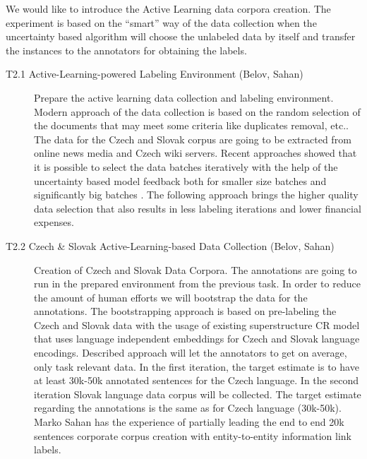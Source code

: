 We would like to introduce the Active Learning data corpora creation. The experiment is based on the “smart” way of the data collection when the uncertainty based algorithm will choose the unlabeled data by itself and transfer the instances to the annotators for obtaining the labels. 

\begin{description}
	\item [T2.1 Active-Learning-powered Labeling Environment (Belov, Sahan)] Prepare the active learning data collection and labeling environment.
Modern approach of the data collection is based on the random selection of the documents that may meet some criteria like duplicates removal, etc.. The data for the Czech and Slovak corpus are going to be extracted from online news media and Czech wiki servers. Recent approaches showed that it is possible to select the data batches iteratively with the help of the uncertainty based model feedback both for smaller size batches \cite{gal2017deep, lowell2018practical} and significantly big batches \cite{citovsky2021batch}. The following approach brings the higher quality data selection that also results in less labeling iterations and lower financial expenses.

	\item [T2.2 Czech \& Slovak Active-Learning-based Data Collection (Belov, Sahan)] Creation of Czech and Slovak Data Corpora. The annotations are going to run in the prepared environment from the previous task. In order to reduce the amount of human efforts we will bootstrap the data for the annotations. The bootstrapping approach is based on pre-labeling the Czech and Slovak data with the usage of existing superstructure CR model that uses language independent embeddings for Czech and Slovak language encodings. Described approach will let the annotators to get on average, only task relevant data.
In the first iteration, the target estimate is to have at least 30k-50k annotated sentences for the Czech language. In the second iteration Slovak language data corpus will be collected. The target estimate regarding the annotations is the same as for Czech language (30k-50k). Marko Sahan has the experience of partially leading the end to end 20k sentences corporate corpus creation with entity-to-entity information link labels.  


\end{description}
